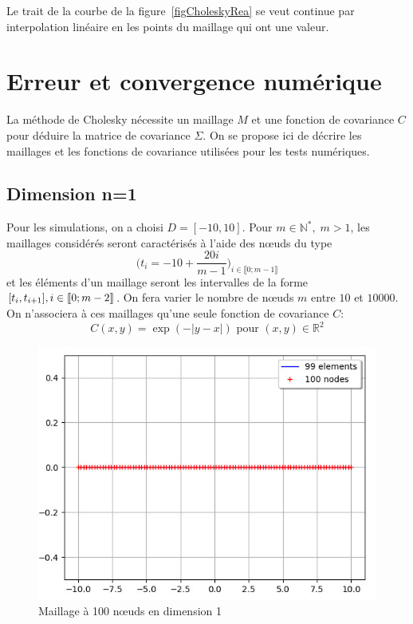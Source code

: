 \begin{remark}
Le trait de la courbe de la figure~\ref{figCholeskyRea} se veut continue par interpolation linéaire en les points du maillage qui ont une valeur.
\end{remark}

\section{Erreur et convergence numérique}
\label{errConvCholesky}
La méthode de Cholesky nécessite un maillage $M$ et une fonction
de covariance $C$ pour déduire la matrice de covariance $\Sigma$. On se propose ici de décrire
les maillages et les fonctions de covariance utilisées pour les tests numériques.

\subsection{Dimension n=1}
\label{dimUnChol}
Pour les simulations, on a choisi $D = [-10,10]$. Pour $m \in \mathbb{N}^{*}, \; m > 1$,
les maillages considérés seront caractérisés à l'aide des n\oe uds du type
\begin{equation*} \biggl (t_i = -10 + \frac{20i}{m-1}\biggr)_{i \in \llbracket 0;m-1 \rrbracket}  \end{equation*}
et les éléments d'un maillage seront les intervalles de la forme $[t_i,t_{i+1}], \\i \in \llbracket 0;m-2 \rrbracket $.
On fera varier le nombre de n\oe uds $m$ entre $10$ et $10000$.\\
On n'associera à ces maillages qu'une seule fonction de covariance $C$:
\begin{equation*} C(x,y) = \exp(-|y-x|) \text{ pour } (x,y) \in \mathbb{R}^2 \end{equation*}

\begin{figure}[h]
\begin{center}
\includegraphics[scale=0.6]{images/CholeskyDim1-100.jpg}
\caption{Maillage à 100 n\oe uds en dimension 1}
\label{CholeskyMaillageDim1-100}  
\end{center}
\end{figure}


